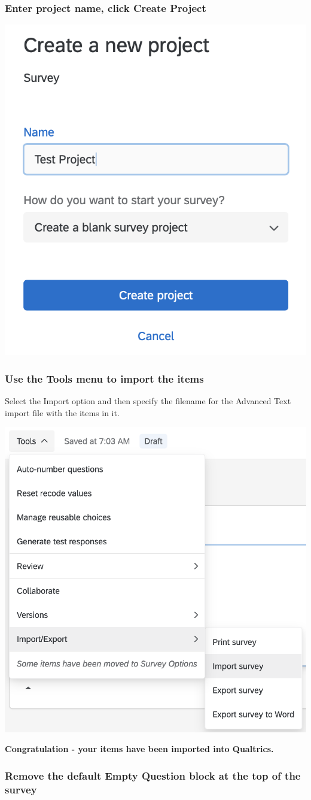 \documentclass[
]{krantz}
\begin{document}
\hypertarget{enter-project-name-click-create-project}{%
\subsubsection{Enter project name, click Create Project}\label{enter-project-name-click-create-project}}

\includegraphics[width=0.4\linewidth]{ch_qualtrics/images/screenshot_b4}

\hypertarget{use-the-tools-menu-to-import-the-items}{%
\subsubsection{Use the Tools menu to import the items}\label{use-the-tools-menu-to-import-the-items}}

Select the Import option and then specify the filename for the Advanced Text import file with the items in it.

\includegraphics[width=0.5\linewidth]{ch_qualtrics/images/screenshot_b5}

\textbf{Congratulation - your items have been imported into Qualtrics.}

\hypertarget{remove-the-default-empty-question-block-at-the-top-of-the-survey}{%
\subsubsection{Remove the default Empty Question block at the top of the survey}\label{remove-the-default-empty-question-block-at-the-top-of-the-survey}}
\end{document}
